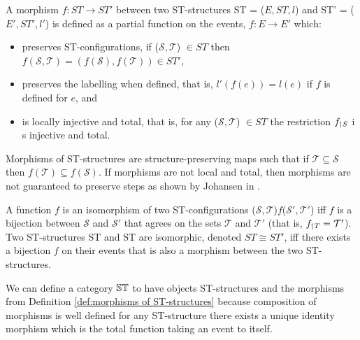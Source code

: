     \begin{definition}
        \label{def:morphisms of ST-structures}
        A morphism $f: ST \rightarrow ST'$ between two ST-structures ST = ($E, ST, l$) and ST' = ($E', ST', l'$) is defined as a partial function on the events, $f: E \rightarrow E'$ which:
        
        \begin{itemize}
            \item preserves ST-configurations, if ($\mathcal{S},\mathcal{T}$) $\in ST$ then $f(\mathcal{S},\mathcal{T}) = (f(\mathcal{S}),f(\mathcal{T})) \in ST'$,
            \item preserves the labelling when defined, that is, $l'(f(e)) = l(e)$ if $f$ is defined for $e$, and
            \item is locally injective and total, that is, for any ($\mathcal{S}, \mathcal{T}$) $\in ST$ the restriction $f_{\upharpoonleft S}$ i s injective and total.
        \end{itemize}
    \end{definition}
    
    Morphisms of ST-structures are structure-preserving maps such that if $\mathcal{T} \subseteq \mathcal{S}$ then $f(\mathcal{T}) \subseteq f(\mathcal{S})$. If morphisms are not local and total, then morphisms are not guaranteed to preserve steps as shown by Johansen in \cite[Proposition 2.21]{Johansen16STstruct}.
    
    \begin{definition}
        \label{def:isomorphic-ST-structures}
        A function $f$ is an isomorphism of two ST-configurations ($\mathcal{S},\mathcal{T}$)$f$($\mathcal{S}',\mathcal{T}'$) iff $f$ is a bijection between $\mathcal{S}$ and $\mathcal{S}'$ that agrees on the sets $\mathcal{T}$ and $\mathcal{T}'$ (that is, $f _{\upharpoonleft T} = \mathcal{T}'$). Two ST-structures ST and ST are isomorphic, denoted $ST \cong ST'$, iff there exists a bijection $f$ on their events that is also a morphism between the two ST-structures. 
    \end{definition}
    
    
    \begin{definition}
        \label{def:category of ST}
        We can define a category $\mathbb{ST}$ to have objects ST-structures and the morphisms from Definition \ref{def:morphisms of ST-structures} because composition of morphisms is well defined for any ST-structure there exists a unique identity morphism which is the total function taking an event to itself.
    \end{definition}